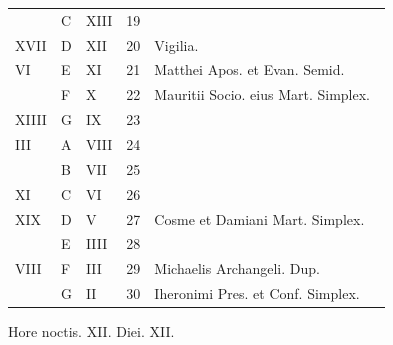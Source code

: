 \begin{center}
\begin{tabular}{l | l | l | r | l l}
\color{Red}  & C & \color{Red} XIII & 19 & & \color{Red} \\
\color{Red} XVII & D & \color{Red} XII & 20 & \color{Red} \qquad \color{Red} Vigilia. \\
\color{Red} VI & E & \color{Red} XI & 21 & \multicolumn{2}{l}{Matthei Apos. et Evan. Semid.} \color{Red} \\
\color{Red}  & F & \color{Red} X & 22 & \multicolumn{2}{l}{Mauritii Socio. eius Mart. Simplex.} \color{Red} \\
\color{Red} XIIII & G & \color{Red} IX & 23 &  & \color{Red} \\
\color{Red} III & \color{Red} A & \color{Red} VIII & 24 & & \color{Red} \\
\color{Red}  & B & \color{Red} VII & 25 & & \color{Red} \\
\color{Red} XI & C & \color{Red} VI & 26 & & \color{Red} \\
\color{Red} XIX & D & \color{Red} V & 27 & \color{Red} Cosme et Damiani Mart. Simplex. \\
\color{Red}  & E & \color{Red} IIII & 28 & & \color{Red} \\
\color{Red} VIII & F & \color{Red} III & 29 & \color{Red} Michaelis Archangeli. Dup. & \color{Red} \\
\color{Red}  & G & \color{Red} II & 30 & Iheronimi Pres. et Conf. Simplex. \\
\end{tabular}
\newline \color{Red} Hore noctis. XII. Diei. XII.
\end{center}



\newpage
\color{Red}\color{black}

